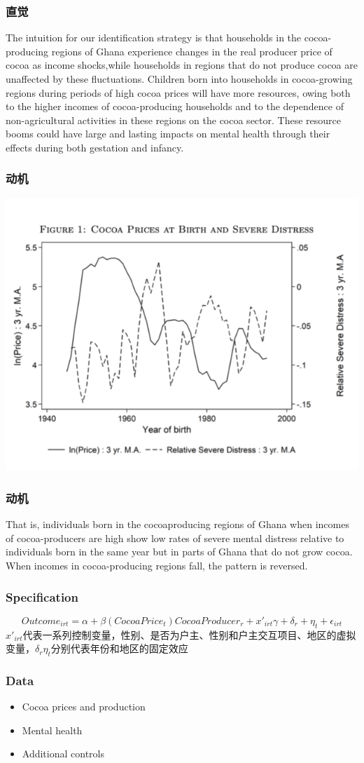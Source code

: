 \documentclass{beamer}
\begin{document}
\begin{frame}
	\frametitle{直觉}
	The intuition for our identiﬁcation strategy is that households in the cocoa-producing regions of Ghana experience changes in the real producer price of cocoa as income shocks,while households in regions that do not produce cocoa are unaﬀected by these ﬂuctuations. Children born into households in cocoa-growing regions during periods of high cocoa prices will have more resources, owing both to the higher incomes of cocoa-producing households and to the dependence of non-agricultural activities in these regions on the cocoa sector. These resource booms could have large and lasting impacts on mental health through their eﬀects during both gestation and infancy.
\end{frame}

\begin{frame}
	\frametitle{动机}
	\centering
	\includegraphics[scale=0.5]{figure1}
\end{frame}

\begin{frame}
	\frametitle{动机}
	That is, individuals born in the cocoaproducing regions of Ghana when incomes of cocoa-producers are high show low rates of severe mental distress relative to individuals born in the same year but in parts of Ghana that do not grow cocoa. When incomes in cocoa-producing regions fall, the pattern is reversed.
\end{frame}

\begin{frame}
	\frametitle{Specification}
	$$Outcome_{irt} = \alpha + \beta (CocoaPrice_t)CocoaProducer_r +x'_{irt}\gamma+\delta_r+\eta_t+\epsilon_{irt}$$
$x'_{irt}$代表一系列控制变量，性别、是否为户主、性别和户主交互项目、地区的虚拟变量，$\delta_r \eta_t$分别代表年份和地区的固定效应


\end{frame}
\begin{frame}
	\frametitle{Data}
	\begin{itemize}
		\item Cocoa prices and production
		\item Mental health
		\item Additional controls
	\end{itemize}
\end{frame}
\end{document}
